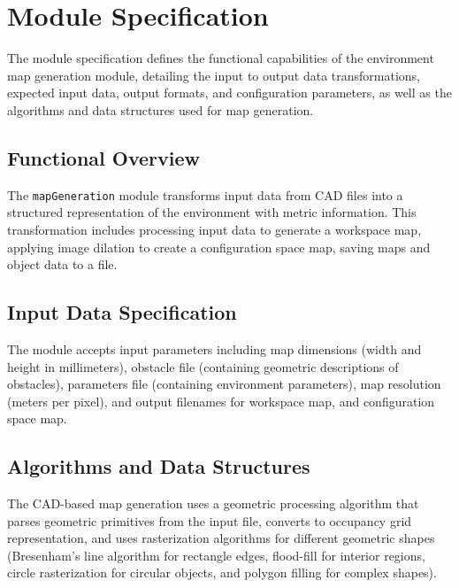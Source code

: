 \documentclass{CSSRforAfrica}
\begin{document}
\newpage
\section{Module Specification}
The module specification defines the functional capabilities of the environment map generation module, detailing the input to output data transformations, expected input data, output formats, and configuration parameters, as well as the algorithms and data structures used for map generation.

\subsection{Functional Overview}

The \texttt{mapGeneration} module transforms input data from CAD files into a structured representation of the environment with metric information. This transformation includes processing input data to generate a workspace map, applying image dilation to create a configuration space map, saving maps and object data to a file.

\subsection{Input Data Specification}

The module accepts input parameters including map dimensions (width and height in millimeters), obstacle file (containing geometric descriptions of obstacles), parameters file (containing environment parameters), map resolution (meters per pixel), and output filenames for workspace map, and configuration space map.





\subsection{Algorithms and Data Structures}

The CAD-based map generation uses a geometric processing algorithm that parses geometric primitives from the input file, converts to occupancy grid representation, and uses rasterization algorithms for different geometric shapes (Bresenham's \cite{bresenham_algorithm_1965} line algorithm for rectangle edges, flood-fill for interior regions, circle rasterization for circular objects, and polygon filling for complex shapes). \newline
\end{document}
